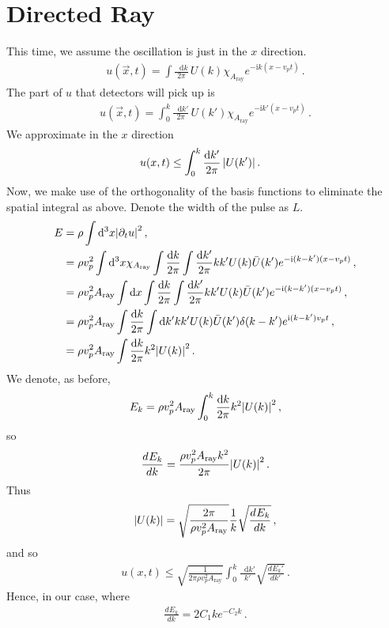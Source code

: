 \documentclass{article}
\newcommand*\diff{\mathop{}\!\mathrm{d}}
\newcommand*\te[1]{\text{#1}}
\newcommand*\f[2]{\frac{#1}{#2}}
\newcommand*\I{\te{i}}
\newcommand*\td[3]{\frac{d^{#3}#1}{d #2^{#3}}}
\begin{document}
\section{Directed Ray}
This time, we assume the oscillation is just in the $x$ direction.
\begin{align}
u(\vec x,t) =\int\f{\diff k}{2\pi}\, U(k)\chi_{A_{\te{ray}}} e^{-\I k(x -v_p t)}\,.
\end{align}
The part of $u$ that detectors will pick up is
\begin{align}
u(\vec x,t) =\int_0^k\f{\diff k'}{2\pi}\, U(k')\chi_{A_{\te{ray}}} e^{-\I k'(x -v_p t)}\,.
\end{align}
We approximate in the $x$ direction
\begin{align}
u(x,t) &\leq \int_0^k\f{\diff k'}{2\pi}\, \abs{U(k')}\,.
\end{align}
Now, we make use of the orthogonality of the basis functions to eliminate the spatial integral as above. Denote the width of the pulse as $L$.
\begin{align}
E &=\rho\int\diff^3 x\abs{\partial_t u}^2\,,\\
&=\rho v_p^2\int\diff^3 x\chi_{A_{\te{ray}}}\int\f{\diff k}{2\pi}\int\f{\diff k'}{2\pi}k k'U(k)\bar U(k') e^{-\I (k-k')(x -v_p t)}\,,\\
&=\rho v_p^2 A_{\te{ray}}\int\diff x\int\f{\diff k}{2\pi}\int\f{\diff k'}{2\pi}k k'U(k)\bar U(k') e^{-\I (k-k')(x -v_p t)}\,,\\
&=\rho v_p^2 A_{\te{ray}}\int\f{\diff k}{2\pi}\int \diff k'k k'U(k)\bar U(k') \delta(k-k')e^{\I (k-k')v_p t}\,,\\
&=\rho v_p^2 A_{\te{ray}}\int\f{\diff k}{2\pi}k^2\abs{U(k)}^2\,.
\end{align}
We denote, as before,
\begin{align}
E_k = \rho v_p^2 A_{\te{ray}}\int_0^k\f{\diff k}{2\pi}k^2\abs{U(k)}^2\,,
\end{align}
so
\begin{align}
\td{E_k}{k}{} =\f{\rho v_p^2 A_{\te{ray}}k^2}{2\pi}\abs{U(k)}^2\,.
\end{align}
Thus
\begin{align}
\abs{U(k)} = \sqrt{\f{2\pi}{\rho v_p^2 A_{\te{ray}}}}\f{1}{k}\sqrt{\td{E_k}{k}{}}\,,
\end{align}
and so
\begin{align}
u(x,t) \leq \sqrt{\f{1}{2\pi \rho v_p^2 A_{\te{ray}}}}\int_0^k\f{\diff k'}{k'}\sqrt{\td{E_k'}{k'}{}}\,.
\end{align}
Hence, in our case, where
\begin{align}
\td{E_k}{k}{} = 2C_1 k e^{-C_2 k}\,.
\end{align}
\end{document}
